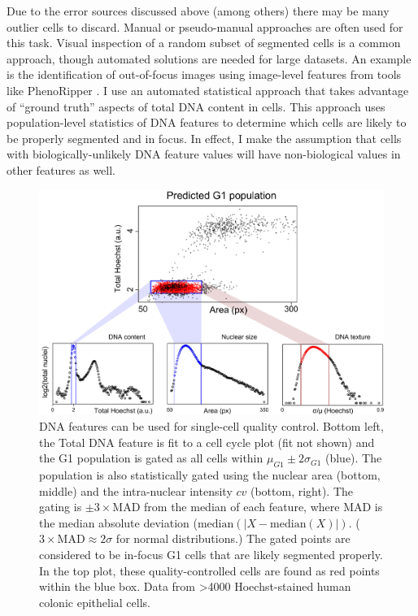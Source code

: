 Due to the error sources discussed above (among others)
there may be many outlier cells to discard. Manual or pseudo-manual
approaches are often used for this task. 
Visual inspection of a random
subset of segmented cells is a common approach,
though automated solutions are needed for large datasets.
An example is the identification of out-of-focus images using
image-level features from tools like PhenoRipper
\cite{Rajaram2012}.
I use an automated statistical approach that takes
advantage of ``ground truth'' aspects of total DNA
content in cells. 
This approach uses population-level statistics
of DNA features to determine which cells
are likely to be properly
segmented and in focus. In effect, I make the assumption that
cells with biologically-unlikely DNA feature values will have
non-biological values in other features as well.




  \begin{figure}[!bt]
  \centering
  \includegraphics[width=6in]{FIGS/imaging/qualityControl.pdf}
  {\singlespacing 
  \caption[ Using DNA features for quality control.]
            {DNA features can be used for single-cell quality
            control. Bottom left, the Total DNA feature
            is fit to a cell cycle plot (fit not shown)
            and the G1 population is gated as all cells
            within $\mu_{G1}\pm2\sigma_{G1}$ (blue). The population is
            also statistically gated using the nuclear area (bottom,
            middle) and the intra-nuclear intensity $cv$ (bottom, right).
            The gating is $\pm3\times\text{MAD}$ from the median of each
            feature, where $\text{MAD}$ is the median absolute deviation
            ($\text{median}(|X-\text{median}(X)|)$. 
            ($3\times\text{MAD}\approx2\sigma$ for normal distributions.)
            The gated points are considered to be in-focus G1 cells
            that are likely segmented properly. In the top plot,
            these quality-controlled
            cells are found as red points within the blue box. Data from
            >4000 Hoechst-stained human colonic epithelial cells.}
  \label{fig:imaging:qualityControl}}
  \end{figure}



